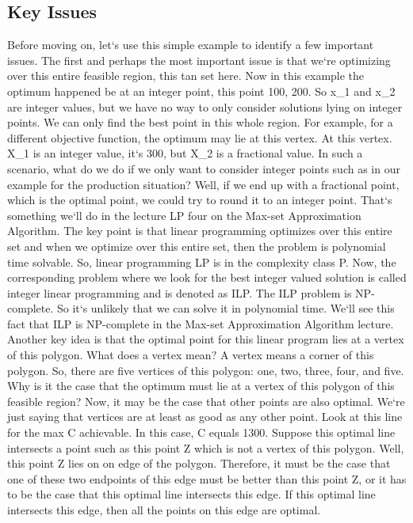 \subsection{Key Issues}
Before moving on, let`s use this simple example to identify a few important issues.
The first and perhaps the most important issue is that we`re optimizing over this entire feasible region, this tan set here.
Now in this example the optimum happened be at an integer point, this point 100, 200.
So x\_1 and x\_2 are integer values, but we have no way to only consider solutions lying on integer points.
We can only find the best point in this whole region.
For example, for a different objective function, the optimum may lie at this vertex.
At this vertex.
X\_1 is an integer value, it`s 300, but X\_2 is a fractional value.
In such a scenario, what do we do if we only want to consider integer points such as in our example for the production situation? Well, if we end up with a fractional point, which is the optimal point, we could try to round it to an integer point.
That`s something we`ll do in the lecture LP four on the Max-set Approximation Algorithm.
The key point is that linear programming optimizes over this entire set and when we optimize over this entire set, then the problem is polynomial time solvable.
So, linear programming LP is in the complexity class P\@.
Now, the corresponding problem where we look for the best integer valued solution is called integer linear programming and is denoted as ILP\@.
The ILP problem is NP-complete.
So it`s unlikely that we can solve it in polynomial time.
We`ll see this fact that ILP is NP-complete in the Max-set Approximation Algorithm lecture.
Another key idea is that the optimal point for this linear program lies at a vertex of this polygon.
What does a vertex mean? A vertex means a corner of this polygon.
So, there are five vertices of this polygon: one, two, three, four, and five.
Why is it the case that the optimum must lie at a vertex of this polygon of this feasible region? Now, it may be the case that other points are also optimal.
We`re just saying that vertices are at least as good as any other point.
Look at this line for the max C achievable.
In this case, C equals 1300.
Suppose this optimal line intersects a point such as this point Z which is not a vertex of this polygon.
Well, this point Z lies on on edge of the polygon.
Therefore, it must be the case that one of these two endpoints of this edge must be better than this point Z, or it has to be the case that this optimal line intersects this edge.
If this optimal line intersects this edge, then all the points on this edge are optimal.
